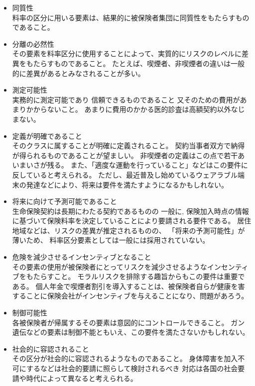 \documentclass[report,gutter=10mm,fore-edge=10mm,uplatex,dvipdfmx]{jlreq}
\begin{document}
\begin{itemize}
\tightlist
\item
  同質性\\
  料率の区分に用いる要素は、結果的に被保険者集団に同質性をもたらすものであること。
\item
  分離の必然性\\
  その要素を料率区分に使用することによって、実質的にリスクのレベルに差異をもたらすものであること。
    たとえば、喫煙者、非喫煙者の違いは一般的に差異があるとみなされることが多い。
\item
  測定可能性\\
    実務的に測定可能であり
    信頼できるものであること
    又そのための費用があまりかからないこと。
    あまりに費用のかかる医的診査は高額契約以外なじまない。
\item
  定義が明確であること\\
    そのクラスに属することが明確に定義されること。
    契約当事者双方で納得が得られるものであることが望ましい。
    非喫煙者の定義はこの点で若干あいまいさが残る。
      また、「適度な運動を行っていること」などはこの要件に反していると考えられる。
        ただし、最近普及し始めているウェアラブル端末の発達などにより、将来は要件を満たすようになるかもしれない。
\item
  将来に向けて予測可能であること\\
    生命保険契約は長期にわたる契約であるものの
    一般に, 保険加入時点の情報に基づいて保険料率を決定していることにより要請される要件である。
居住地域などは、リスクの差異が推定されるものの、
「将来の予測可能性」が薄いため、
料率区分要素としては一般には採用されていない。
\item
  危険を減少させるインセンティブとなること\\
    その要素の使用が被保険者にとってリスクを減少させるようなインセンティブをもたらすこと。
    モラルリスクを排除する趣旨からもこの要件は重要である。
    個人年金で喫煙者割引を導入することは、被保険者自らが健康を害することに保険会社がインセンティブを与えることになり、問題があろう。
\item
  制御可能性\\
    各被保険者が帰属するその要素は意図的にコントロールできること。
      ガン遺伝などの要素は制御不能ともいえ、この要件を満たさないかもしれない。

\item
  社会的に容認されること\\
    その区分が社会的に容認されるようなものであること。
      身体障害を加入不可にするなどは社会的要請に照らして検討されるべき
      対応は各国の社会要請や時代によって異なると考えられる。
\end{itemize}
\end{document}
